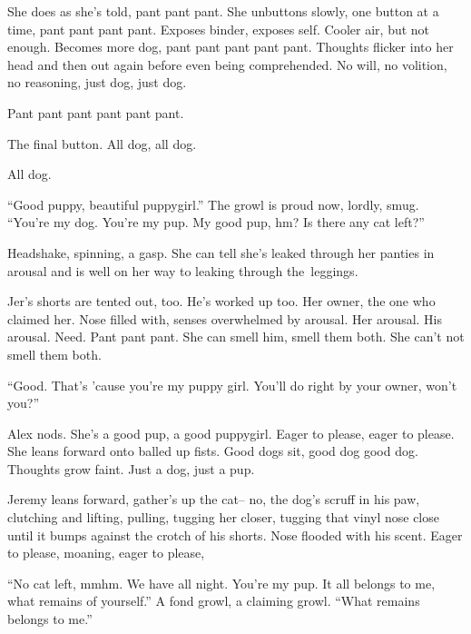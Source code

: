 She does as she's told, pant pant pant. She unbuttons slowly, one button at a time, pant pant pant pant. Exposes binder, exposes self. Cooler air, but not enough. Becomes more dog, pant pant pant pant pant. Thoughts flicker into her head and then out again before even being comprehended. No will, no volition, no reasoning, just dog, just dog.

Pant pant pant pant pant pant.

The final button. All dog, all dog.

All dog.

``Good puppy, beautiful puppygirl.'' The growl is proud now, lordly, smug. ``You're my dog. You're my pup. My good pup, hm? Is there any cat left?''

Headshake, spinning, a gasp. She can tell she's leaked through her panties in arousal and is well on her way to leaking through the~leggings.

Jer's shorts are tented out, too. He's worked up too. Her owner, the one who claimed her. Nose filled with, senses overwhelmed by arousal. Her arousal. His arousal. Need. Pant pant pant. She can smell him, smell them both. She can't not smell them both.

``Good. That's 'cause you're my puppy girl. You'll do right by your owner, won't you?''

Alex nods. She's a good pup, a good puppygirl. Eager to please, eager to please. She leans forward onto balled up fists. Good dogs sit, good dog good dog. Thoughts grow faint. Just a dog, just a pup.

Jeremy leans forward, gather's up the cat-- no, the dog's scruff in his paw, clutching and lifting, pulling, tugging her closer, tugging that vinyl nose close until it bumps against the crotch of his shorts. Nose flooded with his scent. Eager to please, moaning, eager to please,

``No cat left, mmhm. We have all night. You're my pup. It all belongs to me, what remains of yourself.'' A fond growl, a claiming growl. ``What remains belongs to me.''
